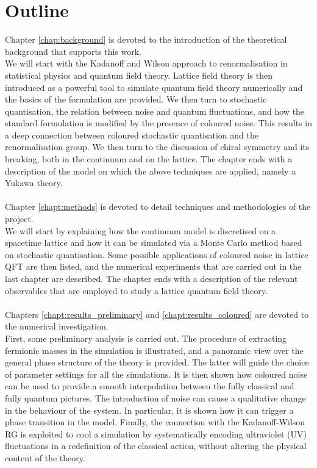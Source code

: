 \section{Outline}
Chapter \ref{chap:background} is devoted to the introduction of the theoretical background that supports this work. \\
We will start with the Kadanoff and Wilson approach to renormalisation in statistical physics and quantum field theory.
Lattice field theory is then introduced as a powerful tool to simulate quantum field theory numerically and the basics of the formulation are provided.     
We then turn to stochastic quantisation, the relation between noise and quantum fluctuations, and how the standard formulation is modified by the presence of coloured noise. 
This results in a deep connection between coloured stochastic quantisation and the renormalisation group. We then turn to the discussion of chiral symmetry and its breaking, both in the continuum and on the lattice.
The chapter ends with a description of the model on which the above techniques are applied, namely a Yukawa theory. \\~\\
Chapter \ref{chapt:methods} is devoted to detail techniques and methodologies of the project. \\
We will start by explaining how the continuum model is discretised on a spacetime lattice and how it can be simulated via a Monte Carlo method based on stochastic quantisation.
Some possible applications of coloured noise in lattice QFT are then listed, and the numerical experiments that are carried out in the last chapter are described.
The chapter ends with a description of the relevant observables that are employed to study a lattice quantum field theory. \\~\\
Chapters \ref{chapt:results_preliminary} and \ref{chapt:results_coloured} are devoted to the numerical investigation. \\
First, some preliminary analysis is carried out. The procedure of extracting fermionic masses in the simulation is illustrated, and a panoramic view over the general phase structure of the theory is provided. The latter will guide the choice of parameter settings for all the simulations.
It is then shown how coloured noise can be used to provide a smooth interpolation between the fully classical and fully quantum pictures.
The introduction of noise can cause a qualitative change in the behaviour of the system. In particular, it is shown how it can trigger a phase transition in the model.
Finally, the connection with the Kadanoff-Wilson RG is exploited to cool a simulation by systematically encoding ultraviolet (UV) fluctuations in a redefinition of the classical action, without altering the physical content of the theory.